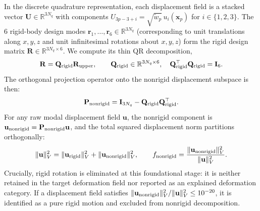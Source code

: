 \documentclass[11pt]{article}
\begin{document}
In the discrete quadrature representation, each displacement field is a stacked vector $\mathbf U \in \mathbb{R}^{3N_q}$ with components $U_{3p-3+i} = \sqrt{\tilde w_p} \, u_i(\mathbf x_p)$ for $i \in \{1,2,3\}$.
The 6 rigid-body design modes $\mathbf r_1, \dots, \mathbf r_6 \in \mathbb{R}^{3N_q}$ (corresponding to unit translations along $x,y,z$ and unit infinitesimal rotations about $x,y,z$) form the rigid design matrix $\mathbf R \in \mathbb{R}^{3N_q \times 6}$.
We compute its thin QR decomposition,
\begin{equation}
\mathbf R = \mathbf Q_{\rm rigid} \mathbf R_{\rm upper}, \qquad \mathbf Q_{\rm rigid} \in \mathbb{R}^{3N_q \times 6}, \quad \mathbf Q_{\rm rigid}^\top \mathbf Q_{\rm rigid} = \mathbf I_6.
\end{equation}
The orthogonal projection operator onto the nonrigid displacement subspace is then:
\begin{equation}
\mathbf P_{\rm nonrigid} = \mathbf I_{3N_q} - \mathbf Q_{\rm rigid} \mathbf Q_{\rm rigid}^\top.
\label{eq:nonrigid-proj}
\end{equation}
For any raw modal displacement field $\mathbf u$, the nonrigid component is $\mathbf u_{\rm nonrigid} = \mathbf P_{\rm nonrigid} \mathbf u$, and the total squared displacement norm partitions orthogonally:
\begin{equation}
\|\mathbf u\|_V^2 = \|\mathbf u_{\rm rigid}\|_V^2 + \|\mathbf u_{\rm nonrigid}\|_V^2, \qquad
f_{\rm nonrigid} = \frac{\|\mathbf u_{\rm nonrigid}\|_V^2}{\|\mathbf u\|_V^2}.
\end{equation}
Crucially, rigid rotation is eliminated at this foundational stage: it is neither retained in the target deformation field nor reported as an explained deformation category.
If a displacement field satisfies $\|\mathbf u_{\rm nonrigid}\|_V^2 / \|\mathbf u\|_V^2 \le 10^{-20}$, it is identified as a pure rigid motion and excluded from nonrigid decomposition.
\end{document}
